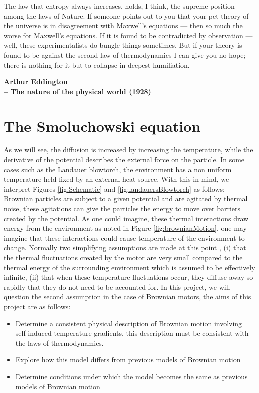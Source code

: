 \epigraph{The law that entropy always increases, holds, I think, the supreme position among the laws of Nature. If someone points out to you that your pet theory of the universe is in disagreement with Maxwell's equations — then so much the worse for Maxwell's equations. If it is found to be contradicted by observation — well, these experimentalists do bungle things sometimes. But if your theory is found to be against the second law of thermodynamics I can give you no hope; there is nothing for it but to collapse in deepest humiliation.}{\textbf{Arthur Eddington \\ -- The nature of the physical world (1928)}}


\section{The Smoluchowski equation} \label{Smoluchowski}

As we will see, the diffusion is increased by increasing the temperature, while the derivative of the potential describes the external force on the particle. In some cases such as the Landauer blowtorch, the environment has a non uniform temperature held fixed by an external heat source. With this in mind, we interpret Figures \ref{fig:Schematic} and \ref{fig:landauersBlowtorch} as follows: Brownian particles are subject to a given potential and are agitated by thermal noise, these agitations can give the particles the energy to move over barriers created by the potential. As one could imagine, these thermal interactions draw energy from the environment as noted in Figure \ref{fig:brownianMotion}, one may imagine that these interactions could cause temperature of the environment to change. Normally two simplifying assumptions are made at this point \cite{Reimann2001}, (i) that the thermal fluctuations created by the motor are very small compared to the thermal energy of the surrounding environment which is assumed to be effectively infinite, (ii) that when these temperature fluctuations occur, they diffuse away so rapidly that they do not need to be accounted for. In this project, we will question the second assumption in the case of Brownian motors, the aims of this project are as follows:
\begin{itemize}
\item{Determine a consistent physical description of Brownian motion involving self-induced temperature gradients, this description must be consistent with the laws of thermodynamics.}
\item{Explore how this model differs from previous models of Brownian motion}
\item{Determine conditions under which the model becomes the same as previous models of Brownian motion}
\end{itemize}

